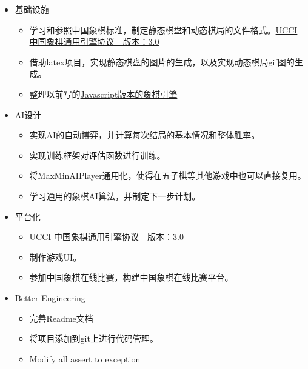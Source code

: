 \documentclass[export, 12pt, letterpaper]{ctexrep}
\begin{document}
\begin{itemize}
\item{ 基础设施
\begin{itemize}
\item{ 学习和参照中国象棋标准，制定静态棋盘和动态棋局的文件格式。\href{https://www.xqbase.com/protocol/cchess_ucci.htm}{UCCI 中国象棋通用引擎协议　版本：3.0} }
\item{ 借助latex项目，实现静态棋盘的图片的生成，以及实现动态棋局gif图的生成。 }
\item{ 整理以前写的\href{https://github.com/JimmyFromSYSU/ChineseChess}{Javascript版本的象棋引擎} }
\end{itemize}
 }
\item{ AI设计
\begin{itemize}
\item{ 实现AI的自动博弈，并计算每次结局的基本情况和整体胜率。 }
\item{ 实现训练框架对评估函数进行训练。 }
\item{ 将MaxMinAIPlayer通用化，使得在五子棋等其他游戏中也可以直接复用。 }
\item{ 学习通用的象棋AI算法，并制定下一步计划。 }
\end{itemize}
 }
\item{ 平台化
\begin{itemize}
\item{ \href{https://www.xqbase.com/protocol/cchess_ucci.htm}{UCCI 中国象棋通用引擎协议　版本：3.0} }
\item{ 制作游戏UI。 }
\item{ 参加中国象棋在线比赛，构建中国象棋在线比赛平台。 }
\end{itemize}
 }
\item{ Better Engineering
\begin{itemize}
\item{ 完善Readme文档 }
\item{ 将项目添加到git上进行代码管理。 }
\item{ Modify all assert to exception }
\end{itemize}
 }
\end{itemize}
\end{document}
